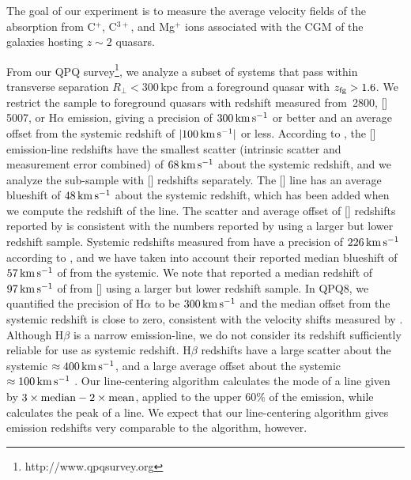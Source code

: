 \documentclass[iop]{emulateapj}
\begin{document}
The goal of our experiment is to measure the average velocity fields of the absorption from C$^+$, 
C$^{3+}$, and Mg$^+$ ions associated with the CGM of the galaxies hosting $z\sim 2$ quasars. 

From our QPQ survey\footnote{http://www.qpqsurvey.org}, we analyze a subset of systems that 
pass within transverse separation $R_\perp<300$\,kpc from a foreground quasar with 
$z_{\rm fg} > 1.6$. We restrict the sample to foreground quasars with redshift measured from 
\,2800, []\,5007, or H$\alpha$ emission, giving a precision of 
$300\,{\rm km\,s^{-1}}$ or better and an average offset from the systemic redshift of 
$|100\,{\rm km\,s^{-1}}|$ or less. According to \cite{Shen+16}, the [] emission-line 
redshifts have the smallest scatter (intrinsic scatter and measurement error combined) of 
$68\,{\rm km\,s^{-1}}$ about the systemic redshift, and we analyze the sub-sample with 
[] redshifts separately. The [] line has an average blueshift of 
$48\,{\rm km\,s^{-1}}$ about the systemic redshift, which has been added when we compute the 
redshift of the line. The scatter and average offset of [] redshifts reported by 
\cite{Shen+16} is consistent with the numbers reported by \cite{Boroson05} using a larger but 
lower redshift sample. Systemic redshifts measured from  have a precision of 
$226\,{\rm km\,s^{-1}}$ according to \cite{Shen+16}, and we have taken into account their 
reported median blueshift of $57\,{\rm km\,s^{-1}}$ of  from the systemic. We note that 
\cite{Richards+02} reported a median redshift of $97\,{\rm km\,s^{-1}}$ of  from 
[] using a larger but lower redshift sample. In QPQ8, we quantified 
the precision of H$\alpha$ to be $300\,{\rm km\,s^{-1}}$ and the median offset from the systemic 
redshift is close to zero, consistent with the velocity shifts measured by \cite{Shen+11}. 
Although H$\beta$ is a narrow emission-line, we do not consider its redshift sufficiently reliable 
for use as systemic redshift. H$\beta$ redshifts have a large scatter about the systemic 
$\approx400\,{\rm km\,s^{-1}}$, and a large average offset about the systemic 
$\approx100\,{\rm km\,s^{-1}}$ \citep[][QPQ8]{Shen+16}.
Our line-centering algorithm calculates the mode of a line given by
$3\times{\rm median}-2\times{\rm mean}$, applied to the upper 60\% of the emission, while
\cite{Shen+16} calculates the peak of a line. We expect that our line-centering algorithm gives
emission redshifts very comparable to the \cite{Shen+16} algorithm, however. \cite{Shen+16}
\end{document}
